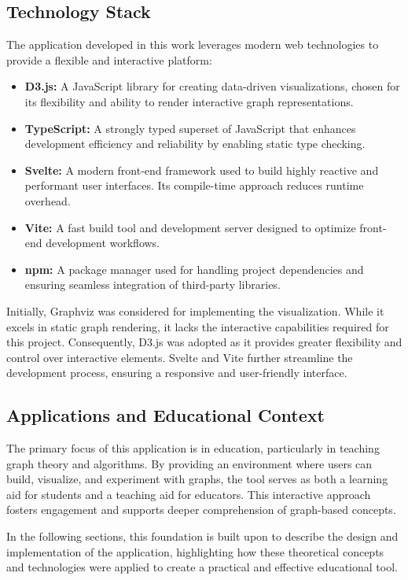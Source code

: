\subsection{Technology Stack}
The application developed in this work leverages modern web technologies to provide a flexible and interactive platform:
\begin{itemize}
    \item \textbf{D3.js:} A JavaScript library for creating data-driven visualizations, chosen for its flexibility and ability to render interactive graph representations.
    \item \textbf{TypeScript:} A strongly typed superset of JavaScript that enhances development efficiency and reliability by enabling static type checking.
    \item \textbf{Svelte:} A modern front-end framework used to build highly reactive and performant user interfaces. Its compile-time approach reduces runtime overhead.
    \item \textbf{Vite:} A fast build tool and development server designed to optimize front-end development workflows.
    \item \textbf{npm:} A package manager used for handling project dependencies and ensuring seamless integration of third-party libraries.
\end{itemize}
Initially, Graphviz was considered for implementing the visualization. While it excels in static graph rendering, it lacks the interactive capabilities required for this project. Consequently, D3.js was adopted as it provides greater flexibility and control over interactive elements. Svelte and Vite further streamline the development process, ensuring a responsive and user-friendly interface.

\subsection{Applications and Educational Context}
The primary focus of this application is in education, particularly in teaching graph theory and algorithms. By providing an environment where users can build, visualize, and experiment with graphs, the tool serves as both a learning aid for students and a teaching aid for educators. This interactive approach fosters engagement and supports deeper comprehension of graph-based concepts.

In the following sections, this foundation is built upon to describe the design and implementation of the application, highlighting how these theoretical concepts and technologies were applied to create a practical and effective educational tool.
